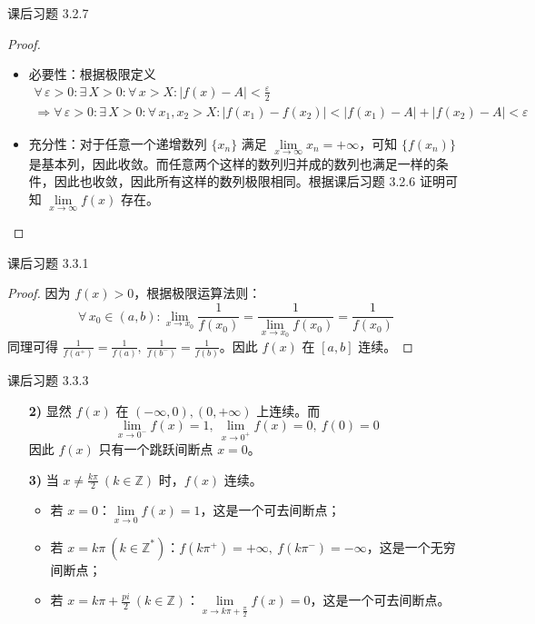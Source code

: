 \begin{problem}
	课后习题 3.2.7

	\begin{proof}
		\begin{itemize}
			\item 必要性：根据极限定义
			$$
			\begin{gathered}
				\forall\,\varepsilon > 0: \exists\,X > 0: \forall\,x > X: |f(x) - A| < \frac{\varepsilon}{2} \\
				\Rightarrow \forall\,\varepsilon > 0: \exists\,X > 0: \forall\,x_1,x_2 > X: |f(x_1) - f(x_2)| < |f(x_1) - A| + |f(x_2) - A| < \varepsilon
			\end{gathered}
			$$

			\item 充分性：对于任意一个递增数列 $\{x_n\}$ 满足 $\lim\limits_{x \to \infty} x_n = +\infty$，可知 $\{f(x_n)\}$ 是基本列，因此收敛。而任意两个这样的数列归并成的数列也满足一样的条件，因此也收敛，因此所有这样的数列极限相同。根据课后习题 3.2.6 证明可知 $\lim\limits_{x \to \infty} f(x)$ 存在。
		\end{itemize}
	\end{proof}
\end{problem}

\begin{problem}
	课后习题 3.3.1

	\begin{proof}
		因为 $f(x) > 0$，根据极限运算法则：
		$$
		\forall\,x_0 \in (a,b): \lim_{x \to x_0} \frac{1}{f(x_0)} = \frac{1}{\lim\limits_{x \to x_0} f(x_0)} = \frac{1}{f(x_0)}
		$$
		同理可得 $\frac{1}{f(a^+)} = \frac{1}{f(a)},\ \frac{1}{f(b^-)} = \frac{1}{f(b)}$。因此 $f(x)$ 在 $[a,b]$ 连续。
	\end{proof}
\end{problem}

\begin{problem}
	课后习题 3.3.3

	\begin{solution}
		\begin{enumerate}
			\item[\textbf{2)}] 显然 $f(x)$ 在 $(-\infty, 0), (0, +\infty)$ 上连续。而
			$$
			\lim_{x \to 0^-} f(x) = 1,\ \lim_{x \to 0^+} f(x) = 0,\ f(0) = 0
			$$
			因此 $f(x)$ 只有一个跳跃间断点 $x = 0$。

			\item[\textbf{3)}] 当 $x \neq \frac{k \pi}{2}\ (k \in \mathbb{Z})$ 时，$f(x)$ 连续。
			\begin{itemize}
				\item 若 $x = 0$：$\lim\limits_{x \to 0} f(x) = 1$，这是一个可去间断点；
				\item 若 $x = k\pi\ (k \in \mathbb{Z}^*)$：$f(k \pi^+) = +\infty,\ f(k \pi^-) = -\infty$，这是一个无穷间断点；
				\item 若 $x = k\pi + \frac{pi}{2}\ (k \in \mathbb{Z})$：$\lim\limits_{x \to k\pi + \frac{\pi}{2}} f(x) = 0$，这是一个可去间断点。
			\end{itemize}
		\end{enumerate}
	\end{solution}
\end{problem}

